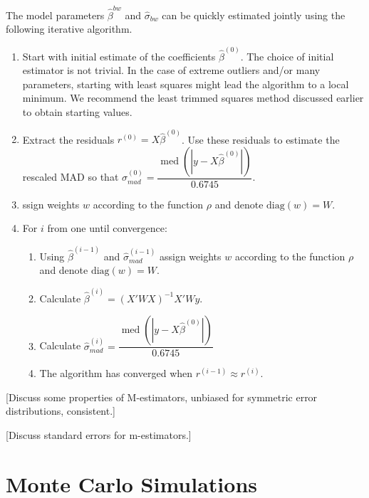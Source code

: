 \documentclass[10pt]{article}
\DeclareMathOperator{\med}{med}
\begin{document}
The model parameters $\hat{\beta}^{bw}$ and $\hat{\sigma}_{bw}$ can be quickly estimated jointly using the following iterative algorithm.
\begin{enumerate}
\item Start with initial estimate of the coefficients $\hat{\beta}^{(0)}$. The choice of initial estimator is not trivial. In the case of extreme outliers and/or many parameters, starting with least squares might lead the algorithm to a local minimum. We recommend the least trimmed squares method discussed earlier to obtain starting values.
\item Extract the residuals $r^{(0)} = X\hat{\beta}^{(0)}$. Use these residuals to estimate the rescaled MAD so that $\hat{\sigma}^{(0)}_{mad} = \dfrac{\med\left( |y - X\hat{\beta}^{(0)}|\right)}{0.6745}$.
\item ssign weights $w$ according to the function $\rho$ and denote $\text{diag}(w) = W$.
\item For $i$ from one until convergence:
	\begin{enumerate}
	\item Using $\hat{\beta}^{(i-1)}$ and $\hat{\sigma}^{(i-1)}_{mad}$ assign weights $w$ according to the function $\rho$ and denote $\text{diag}(w) = W$.
	\item Calculate $\hat{\beta}^{(i)} = (X'WX)^{-1}X'Wy$.
	\item Calculate $\hat{\sigma}^{(i)}_{mad} = \dfrac{\med\left( |y - X\hat{\beta}^{(0)}|\right)}{0.6745}$
	\item The algorithm has converged when $r^{(i-1)} \approx r^{(i)}$.
	\end{enumerate}
\end{enumerate}

[Discuss some properties of M-estimators, unbiased for symmetric error distributions, consistent.]

[Discuss standard errors for m-estimators.]

\section*{Monte Carlo Simulations}
\end{document}
